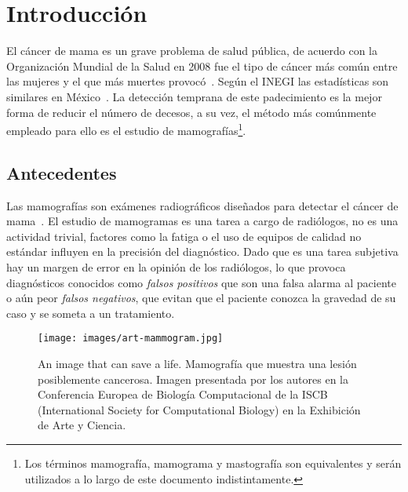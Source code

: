 \chapter{Introducción}
\label{generalidades}
 \setcounter{page}{1}


El cáncer de mama es un grave problema de salud pública, de acuerdo con la
Organización Mundial de la Salud en 2008 fue el tipo de cáncer más común entre
las mujeres y el que más muertes provocó~\cite{cancerreport}. Según el
INEGI las estadísticas son similares en México~\cite{mxcancer, inegi}. La
detección temprana de este padecimiento es la mejor forma de reducir el número
de decesos, a su vez, el método más comúnmente empleado para ello es el estudio
de mamografías\footnote{Los términos mamografía, mamograma y mastografía son
equivalentes y serán utilizados a lo largo de este documento indistintamente.}.

\section{Antecedentes}

Las mamografías son exámenes radiográficos diseñados para detectar el cáncer de
mama~\cite{bushberg2011essential}. El estudio de mamogramas es una tarea a
cargo de radiólogos, no es una actividad trivial, factores como la fatiga o el
uso de equipos de calidad no estándar influyen en la precisión del diagnóstico.
Dado que es una tarea subjetiva hay un margen de error en la opinión de los
radiólogos, lo que provoca diagnósticos conocidos como \textit{falsos
positivos} que son una falsa alarma al paciente o aún peor \textit{falsos
negativos}, que evitan que el paciente conozca la gravedad de su caso y se
someta a un tratamiento.

\begin{figure}[h]
    \centering

    \texttt{[image: images/art-mammogram.jpg]}

  \caption[An image that can save a life] {An image that can save a life.
      Mamografía que muestra una lesión posiblemente cancerosa. Imagen
      presentada por los autores en la  Conferencia Europea de Biología
      Computacional de la ISCB (International Society for Computational
  Biology) en la Exhibición de Arte y Ciencia.}

  \label{savealife}
\end{figure}

